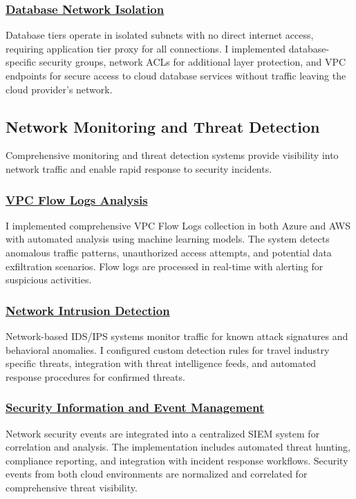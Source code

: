 \subsubsection*{\underline{Database Network Isolation}}
Database tiers operate in isolated subnets with no direct internet access, requiring application tier proxy for all connections. I implemented database-specific security groups, network ACLs for additional layer protection, and VPC endpoints for secure access to cloud database services without traffic leaving the cloud provider's network.

\subsection{Network Monitoring and Threat Detection}
Comprehensive monitoring and threat detection systems provide visibility into network traffic and enable rapid response to security incidents.

\subsubsection*{\underline{VPC Flow Logs Analysis}}
I implemented comprehensive VPC Flow Logs collection in both Azure and AWS with automated analysis using machine learning models. The system detects anomalous traffic patterns, unauthorized access attempts, and potential data exfiltration scenarios. Flow logs are processed in real-time with alerting for suspicious activities.

\subsubsection*{\underline{Network Intrusion Detection}}
Network-based IDS/IPS systems monitor traffic for known attack signatures and behavioral anomalies. I configured custom detection rules for travel industry specific threats, integration with threat intelligence feeds, and automated response procedures for confirmed threats.

\subsubsection*{\underline{Security Information and Event Management}}
Network security events are integrated into a centralized SIEM system for correlation and analysis. The implementation includes automated threat hunting, compliance reporting, and integration with incident response workflows. Security events from both cloud environments are normalized and correlated for comprehensive threat visibility.

